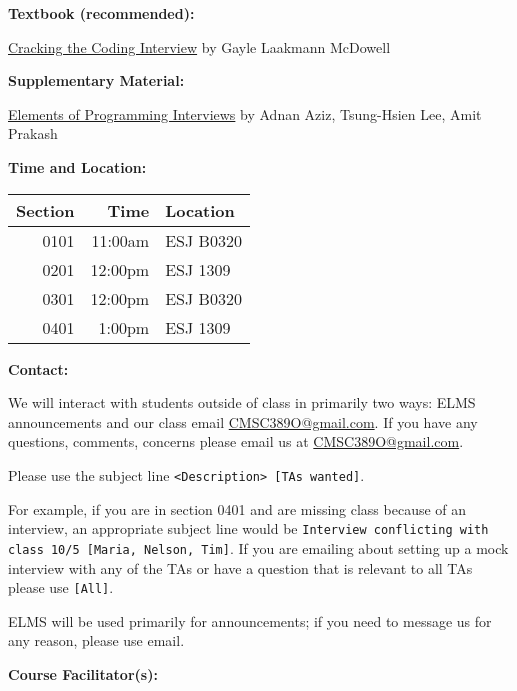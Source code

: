 \documentclass[12pt]{article}
\begin{document}
\noindent\textbf{Textbook (recommended): }

\noindent\href{https://www.amazon.com/Cracking-Coding-Interview-Programming-Questions/dp/0984782850/}{Cracking the Coding Interview}
{\small by Gayle Laakmann McDowell} \medskip

\noindent\textbf{Supplementary Material: }

\noindent \href{https://www.amazon.com/Elements-Programming-Interviews-Python-Insiders/dp/1537713949}{Elements of Programming Interviews}
{\small by Adnan Aziz, Tsung-Hsien Lee, Amit Prakash}
\medskip

\noindent\textbf{Time and Location:}
\begin{table}[h!]
  \begin{tabular}{rrl}
    Section & Time    & Location  \\
    \hline
    0101 & 11:00am & ESJ B0320 \\
    0201 & 12:00pm & ESJ 1309  \\
    0301 & 12:00pm & ESJ B0320 \\
    0401 & 1:00pm  & ESJ 1309 
  \end{tabular}
\end{table}
\medskip

\noindent\textbf{Contact: }

\noindent We will interact with students outside of class in primarily two ways:
ELMS announcements and our class email \href{mailto:CMSC389O@gmail.com}{CMSC389O@gmail.com}.
If you have any questions, comments, concerns please email us at \href{mailto:CMSC389O@gmail.com}{CMSC389O@gmail.com}.

Please use the subject line \texttt{<Description> [TAs wanted]}.

For example, if you are in section 0401 and are missing class because of an interview,
an appropriate subject line would be
\texttt{Interview conflicting with class 10/5 [Maria, Nelson, Tim]}.
If you are emailing about setting up a mock interview with any of the TAs
or have a question that is relevant to all TAs please use \texttt{[All]}.

ELMS will be used primarily for announcements; if you need to message us for any reason,
please use email.

\medskip

\noindent\textbf{Course Facilitator(s): }
\end{document}
